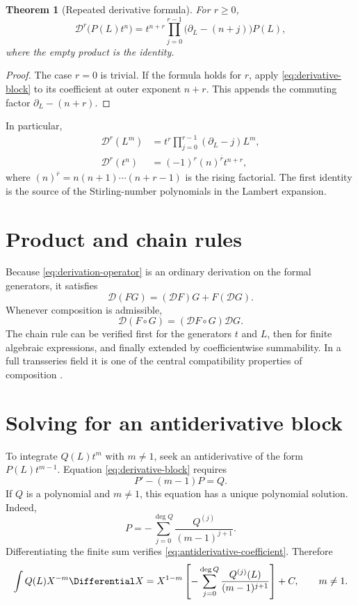 \documentclass[11pt,oneside]{book}
\newtheorem{theorem}{Theorem}[chapter]
\theoremstyle{definition}
\theoremstyle{remark}
\newcommand{\D}{\mathcal D}
\newcommand{\compose}{\mathbin{\circ}}
\begin{document}
\begin{theorem}[Repeated derivative formula]\label{thm:repeated-derivative}
For $r\ge0$,
\begin{equation}\label{eq:repeated-derivative}
 \D^r\bigl(P(L)t^n\bigr)
 =t^{n+r}
 \prod_{j=0}^{r-1}\bigl(\partial_L-(n+j)\bigr)P(L),
\end{equation}
where the empty product is the identity.
\end{theorem}
\begin{proof}
The case $r=0$ is trivial.  If the formula holds for $r$, apply
\eqref{eq:derivative-block} to its coefficient at outer exponent $n+r$.
This appends the commuting factor $\partial_L-(n+r)$.
\end{proof}

In particular,
\begin{align*}
 \D^r(L^m)
 &=t^r\prod_{j=0}^{r-1}(\partial_L-j)L^m,\\
 \D^r(t^n)
 &=(-1)^r(n)^{\overline r}t^{n+r},
\end{align*}
where $(n)^{\overline r}=n(n+1)\cdots(n+r-1)$ is the rising factorial.
The first identity is the source of the Stirling-number polynomials in the
Lambert expansion.

\section{Product and chain rules}
Because \eqref{eq:derivation-operator} is an ordinary derivation on the
formal generators, it satisfies
\[
 \D(FG)=(\D F)G+F(\D G).
\]
Whenever composition is admissible,
\begin{equation}\label{eq:formal-chain-rule}
 \D(F\compose G)=(\D F\compose G)\D G.
\end{equation}
The chain rule can be verified first for the generators $t$ and $L$, then for
finite algebraic expressions, and finally extended by coefficientwise
summability.  In a full transseries field it is one of the central
compatibility properties of composition \cite{EdgarComposition,vdHoeven2006}.

\section{Solving for an antiderivative block}
To integrate $Q(L)t^m$ with $m\ne1$, seek an antiderivative of the form
$P(L)t^{m-1}$.  Equation \eqref{eq:derivative-block} requires
\begin{equation}\label{eq:antiderivative-coefficient}
 P'-(m-1)P=Q.
\end{equation}
If $Q$ is a polynomial and $m\ne1$, this equation has a unique polynomial
solution.  Indeed,
\begin{equation}\label{eq:antiderivative-finite}
 P=-\sum_{j=0}^{\deg Q}
 \frac{Q^{(j)}}{(m-1)^{j+1}}.
\end{equation}
Differentiating the finite sum verifies \eqref{eq:antiderivative-coefficient}.
Therefore
\begin{equation}\label{eq:integral-block}
 \int Q(L)X^{-m}\Differential X
 =X^{1-m}
 \left[-\sum_{j=0}^{\deg Q}\frac{Q^{(j)}(L)}{(m-1)^{j+1}}\right]+C,
 \qquad m\ne1.
\end{equation}
\end{document}
